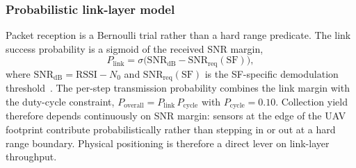 \subsubsection{Probabilistic link-layer model}

Packet reception is a Bernoulli trial rather than a hard range
predicate. The link success probability is a sigmoid of the received
SNR margin,
\begin{equation}
    P_{\mathrm{link}} = \sigma\!\bigl(\mathrm{SNR}_{\mathrm{dB}} - \mathrm{SNR}_{\mathrm{req}}(\mathrm{SF})\bigr),
    \label{eq:p_link}
\end{equation}
where $\mathrm{SNR}_{\mathrm{dB}} = \mathrm{RSSI} - N_0$ and
$\mathrm{SNR}_{\mathrm{req}}(\mathrm{SF})$ is the SF-specific
demodulation threshold~\cite{augustin2016lora}. The per-step
transmission probability combines the link margin with the duty-cycle
constraint, $P_{\mathrm{overall}} = P_{\mathrm{link}}\,P_{\mathrm{cycle}}$
with $P_{\mathrm{cycle}} = 0.10$. Collection yield therefore depends
continuously on SNR margin: sensors at the edge of the UAV footprint
contribute probabilistically rather than stepping in or out at a hard
range boundary. Physical positioning is therefore a direct lever on
link-layer throughput.
